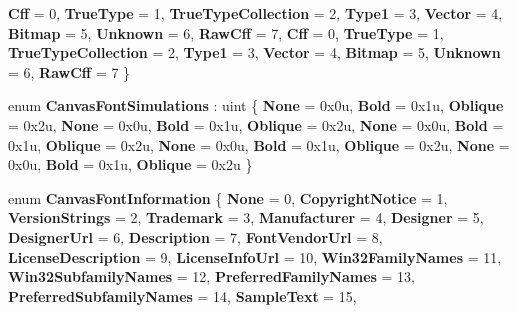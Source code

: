 \begin{DoxyCompactItemize}
\newline
{\bfseries Cff} = 0, 
{\bfseries True\+Type} = 1, 
{\bfseries True\+Type\+Collection} = 2, 
{\bfseries Type1} = 3, 
\newline
{\bfseries Vector} = 4, 
{\bfseries Bitmap} = 5, 
{\bfseries Unknown} = 6, 
{\bfseries Raw\+Cff} = 7, 
\newline
{\bfseries Cff} = 0, 
{\bfseries True\+Type} = 1, 
{\bfseries True\+Type\+Collection} = 2, 
{\bfseries Type1} = 3, 
\newline
{\bfseries Vector} = 4, 
{\bfseries Bitmap} = 5, 
{\bfseries Unknown} = 6, 
{\bfseries Raw\+Cff} = 7
 \}
\item 
\mbox{\label{namespace_microsoft_1_1_graphics_1_1_canvas_1_1_text_a2a86f72637a3f77480105b5a22f96b31}} 
enum {\bfseries Canvas\+Font\+Simulations} \+: uint \{ \newline
{\bfseries None} = 0x0u, 
{\bfseries Bold} = 0x1u, 
{\bfseries Oblique} = 0x2u, 
{\bfseries None} = 0x0u, 
\newline
{\bfseries Bold} = 0x1u, 
{\bfseries Oblique} = 0x2u, 
{\bfseries None} = 0x0u, 
{\bfseries Bold} = 0x1u, 
\newline
{\bfseries Oblique} = 0x2u, 
{\bfseries None} = 0x0u, 
{\bfseries Bold} = 0x1u, 
{\bfseries Oblique} = 0x2u, 
\newline
{\bfseries None} = 0x0u, 
{\bfseries Bold} = 0x1u, 
{\bfseries Oblique} = 0x2u
 \}
\item 
\mbox{\label{namespace_microsoft_1_1_graphics_1_1_canvas_1_1_text_a73fd564ee5399477f9a464ec4ba43d40}} 
enum {\bfseries Canvas\+Font\+Information} \{ \newline
{\bfseries None} = 0, 
{\bfseries Copyright\+Notice} = 1, 
{\bfseries Version\+Strings} = 2, 
{\bfseries Trademark} = 3, 
\newline
{\bfseries Manufacturer} = 4, 
{\bfseries Designer} = 5, 
{\bfseries Designer\+Url} = 6, 
{\bfseries Description} = 7, 
\newline
{\bfseries Font\+Vendor\+Url} = 8, 
{\bfseries License\+Description} = 9, 
{\bfseries License\+Info\+Url} = 10, 
{\bfseries Win32\+Family\+Names} = 11, 
\newline
{\bfseries Win32\+Subfamily\+Names} = 12, 
{\bfseries Preferred\+Family\+Names} = 13, 
{\bfseries Preferred\+Subfamily\+Names} = 14, 
{\bfseries Sample\+Text} = 15, 
\newline

\end{DoxyCompactItemize}

